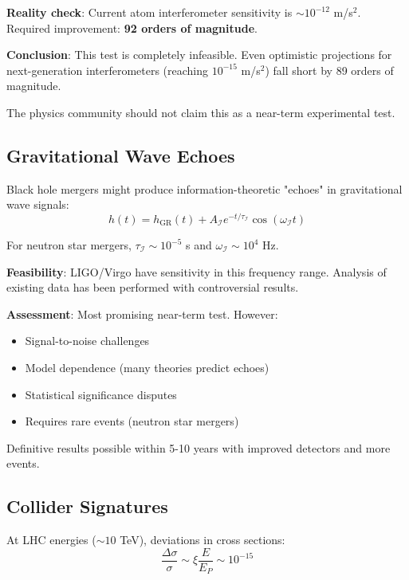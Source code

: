 \documentclass[12pt,twocolumn]{article}
\theoremstyle{definition}
\theoremstyle{remark}
\begin{document}
\textbf{Reality check}: Current atom interferometer sensitivity is $\sim 10^{-12}$ m/s$^2$. Required improvement: \textbf{92 orders of magnitude}.

\textbf{Conclusion}: This test is completely infeasible. Even optimistic projections for next-generation interferometers (reaching $10^{-15}$ m/s$^2$) fall short by 89 orders of magnitude.

The physics community should not claim this as a near-term experimental test.

\subsection{Gravitational Wave Echoes}

Black hole mergers might produce information-theoretic "echoes" in gravitational wave signals:
\begin{equation}
h(t) = h_{\text{GR}}(t) + A_{\mathcal{I}}e^{-t/\tau_{\mathcal{I}}}\cos(\omega_{\mathcal{I}}t)
\end{equation}

For neutron star mergers, $\tau_{\mathcal{I}} \sim 10^{-5}$ s and $\omega_{\mathcal{I}} \sim 10^4$ Hz.

\textbf{Feasibility}: LIGO/Virgo have sensitivity in this frequency range. Analysis of existing data has been performed \cite{Abedi2017} with controversial results.

\textbf{Assessment}: Most promising near-term test. However:
\begin{itemize}
\item Signal-to-noise challenges
\item Model dependence (many theories predict echoes)
\item Statistical significance disputes
\item Requires rare events (neutron star mergers)
\end{itemize}

Definitive results possible within 5-10 years with improved detectors and more events.

\subsection{Collider Signatures}

At LHC energies ($\sim 10$ TeV), deviations in cross sections:
\begin{equation}
\frac{\Delta \sigma}{\sigma} \sim \xi \frac{E}{E_P} \sim 10^{-15}
\end{equation}
\end{document}
